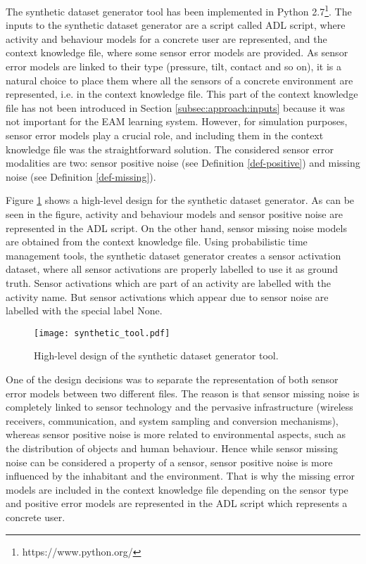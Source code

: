The synthetic dataset generator tool has been implemented in Python 2.7\footnote{https://www.python.org/}. The inputs to the synthetic dataset generator are a script called ADL script, where activity and behaviour models for a concrete user are represented, and the context knowledge file, where some sensor error models are provided. As sensor error models are linked to their type (pressure, tilt, contact and so on), it is a natural choice to place them where all the sensors of a concrete environment are represented, i.e. in the context knowledge file. This part of the context knowledge file has not been introduced in Section \ref{subsec:approach:inputs} because it was not important for the EAM learning system. However, for simulation purposes, sensor error models play a crucial role, and including them in the context knowledge file was the straightforward solution. The considered sensor error modalities are two: sensor positive noise (see Definition \ref{def-positive}) and missing noise (see Definition \ref{def-missing}).

Figure \ref{fig-synth-tool} shows a high-level design for the synthetic dataset generator. As can be seen in the figure, activity and behaviour models and sensor positive noise are represented in the ADL script. On the other hand, sensor missing noise models are obtained from the context knowledge file. Using probabilistic time management tools, the synthetic dataset generator creates a sensor activation dataset, where all sensor activations are properly labelled to use it as ground truth. Sensor activations which are part of an activity are labelled with the activity name. But sensor activations which appear due to sensor noise are labelled with the special label None. 

\begin{figure}[htbp]
\centering
\texttt{[image: synthetic\_tool.pdf]}
    \caption{High-level design of the synthetic dataset generator tool.}
    \label{fig-synth-tool}
\end{figure}

One of the design decisions was to separate the representation of both sensor error models between two different files. The reason is that sensor missing noise is completely linked to sensor technology and the pervasive infrastructure (wireless receivers, communication, and system sampling and conversion mechanisms), whereas sensor positive noise is more related to environmental aspects, such as the distribution of objects and human behaviour. Hence while sensor missing noise can be considered a property of a sensor, sensor positive noise is more influenced by the inhabitant and the environment. That is why the missing error models are included in the context knowledge file depending on the sensor type and positive error models are represented in the ADL script which represents a concrete user.

